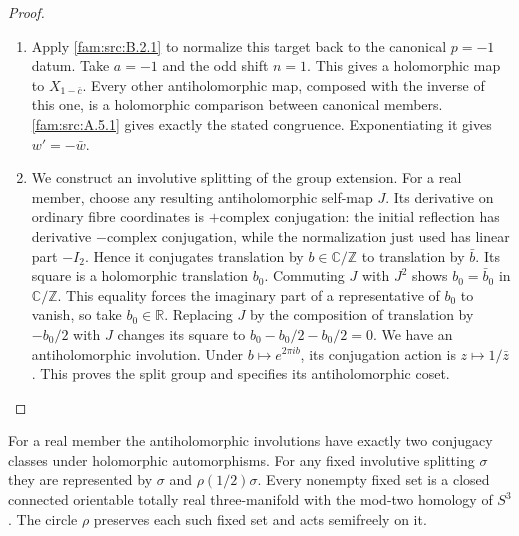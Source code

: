 \begin{proof}
\begin{enumerate}[label=\arabic*.,leftmargin=*]
\item Apply \ref{fam:src:B.2.1} to normalize this target back to the canonical $p=-1$ datum. Take $a=-1$ and the odd shift $n=1$. This gives a holomorphic map to $X_{1-\bar c}$. Every other antiholomorphic map, composed with the inverse of this one, is a holomorphic comparison between canonical members. \ref{fam:src:A.5.1} gives exactly the stated congruence. Exponentiating it gives $w'=-\bar w$.

\item We construct an involutive splitting of the group extension. For a real member, choose any resulting antiholomorphic self-map $J$. Its derivative on ordinary fibre coordinates is $+\text{complex conjugation}$: the initial reflection has derivative $-\text{complex conjugation}$, while the normalization just used has linear part $-I_2$. Hence it conjugates translation by $b\in\mathbb C/\mathbb Z$ to translation by $\bar b$. Its square is a holomorphic translation $b_0$. Commuting $J$ with $J^2$ shows $b_0=\bar b_0$ in $\mathbb C/\mathbb Z$. This equality forces the imaginary part of a representative of $b_0$ to vanish, so take $b_0\in\mathbb R$. Replacing $J$ by the composition of translation by $-b_0/2$ with $J$ changes its square to $b_0-b_0/2-b_0/2=0$. We have an antiholomorphic involution. Under $b\mapsto e^{2\pi ib}$, its conjugation action is $z\mapsto1/\bar z$. This proves the split group and specifies its antiholomorphic coset.
\end{enumerate}
\end{proof}

\begin{proposition}\hypertarget{tag-02PE}{}\label{mapsI:src:A.3.1}

For a real member the antiholomorphic involutions have exactly two
conjugacy classes under holomorphic automorphisms. For any fixed
involutive splitting $\sigma$ they are represented by $\sigma$ and
$\rho(1/2)\sigma$. Every nonempty fixed set is a closed connected
orientable totally real three-manifold with the mod-two homology of
$S^3$. The circle $\rho$ preserves each such fixed set and acts
semifreely on it.
\end{proposition}



